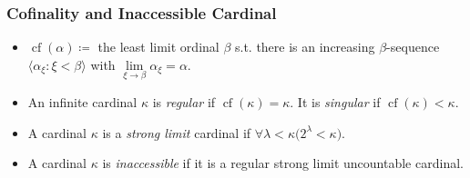 \documentclass[UTF8,aspectratio=43,11pt,colorlinks,compress,openany]{beamer}%
\begin{document}
\begin{frame}\frametitle{Cofinality and Inaccessible Cardinal}
\begin{itemize}
\item $\operatorname{cf}(\alpha)\coloneqq $ the least limit ordinal $\beta$ s.t. there is an increasing $\beta$-sequence $\langle\alpha_\xi:\xi<\beta\rangle$ with $\lim\limits_{\xi\to\beta}\alpha_\xi=\alpha$.
\item An infinite cardinal $\kappa$ is \emph{regular} if $\operatorname{cf}(\kappa)=\kappa$. It is \emph{singular} if $\operatorname{cf}(\kappa)<\kappa$.
\item A cardinal $\kappa$ is a \emph{strong limit} cardinal if $\forall \lambda<\kappa\big(2^\lambda<\kappa\big)$.
\item A cardinal $\kappa$ is \emph{inaccessible} if it is a regular strong limit uncountable cardinal.
\end{itemize}
\end{frame}
\end{document}
